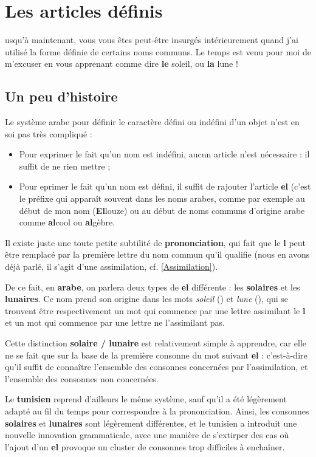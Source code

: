 \chapter{Les articles définis}
usqu'à maintenant, vous vous êtes peut-être insurgés intérieurement quand j'ai utilisé la forme définie de certains noms communs. Le temps est venu pour moi de m'excuser en vous apprenant comme dire \textbf{le} soleil, ou \textbf{la} lune !

\section{Un peu d'histoire}
Le système arabe pour définir le caractère défini ou indéfini d'un objet n'est en soi pas très compliqué : 
\begin{itemize}
    \item Pour exprimer le fait qu'un nom est indéfini, aucun article n'est nécessaire : il suffit de ne rien mettre ;
    \item Pour eprimer le fait qu'un nom est défini, il suffit de rajouter l'article \textbf{el} (c'est le préfixe qui apparaît souvent dans les noms arabes, comme par exemple au début de mon nom (\textbf{El}louze) ou au début de noms communs d'origine arabe comme \textbf{al}cool ou \textbf{al}gèbre.
\end{itemize}

Il existe juste une toute petite subtilité de \textbf{prononciation}, qui fait que le \textbf{l} peut être remplacé par la première lettre du nom commun qu'il qualifie (nous en avons déjà parlé, il s'agit d'une assimilation, cf. \ref{Assimilation}).

De ce fait, en \textbf{arabe}, on parlera deux types de \textbf{el} différente : les \textbf{solaires} et les \textbf{lunaires}. Ce nom prend son origine dans les mots \textit{soleil} () et \textit{lune} (), qui se trouvent être respectivement un mot qui commence par une lettre assimilant le \textbf{l} et un mot qui commence par une lettre ne l'assimilant pas.

Cette distinction \textbf{solaire / lunaire} est relativement simple à apprendre, car elle ne se fait que sur la base de la première consonne du mot suivant \textbf{el} : c'est-à-dire qu'il suffit de connaître l'ensemble des consonnes concernées par l'assimilation, et l'ensemble des consonnes non concernées.

Le \textbf{tunisien} reprend d'ailleurs le même système, sauf qu'il a été légèrement adapté au fil du temps pour correspondre à la prononciation. Ainsi, les consonnes \textbf{solaires} et \textbf{lunaires} sont légèrement différentes, et le tunisien a introduit une nouvelle innovation grammaticale, avec une manière de s'extirper des cas où l'ajout d'un \textbf{el} provoque un cluster de consonnes trop difficiles à enchaîner.

